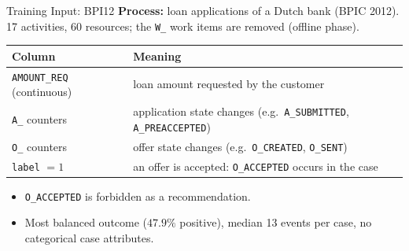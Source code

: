 \documentclass[aspectratio=169]{beamer} %
\begin{document}
\begin{frame}{Training Input: BPI12}
  \footnotesize
  \textbf{Process:} loan applications of a Dutch bank (BPIC 2012). 17 activities,
  60 resources; the \texttt{W\_} work items are removed (offline phase).
  \begin{center}
  \begin{tabular}{lp{9.2cm}}
    \toprule
    \textbf{Column} & \textbf{Meaning} \\
    \midrule
    \texttt{AMOUNT\_REQ} (continuous) & loan amount requested by the customer \\
    \texttt{A\_} counters & application state changes (e.g.\ \texttt{A\_SUBMITTED}, \texttt{A\_PREACCEPTED}) \\
    \texttt{O\_} counters & offer state changes (e.g.\ \texttt{O\_CREATED}, \texttt{O\_SENT}) \\
    \midrule
    \texttt{label} $=1$ & an offer is accepted: \texttt{O\_ACCEPTED} occurs in the case \\
    \bottomrule
  \end{tabular}
  \end{center}
  \begin{itemize}
    \item \texttt{O\_ACCEPTED} is \alert{forbidden} as a recommendation.
    \item Most balanced outcome ($47.9\%$ positive), median 13 events per case,
      no categorical case attributes.
  \end{itemize}
\end{frame}
\end{document}

